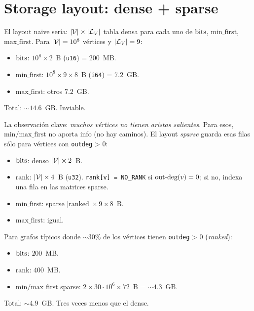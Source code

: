 \section{Storage layout: dense + sparse}

El layout naive sería: \(|\mathcal{V}| \times |\mathcal{L}_V|\) tabla densa para
cada uno de \(\mathrm{bits}\), \(\mathrm{min\_first}\),
\(\mathrm{max\_first}\). Para \(|\mathcal{V}| = 10^8\) vértices y
\(|\mathcal{L}_V| = 9\):

\begin{itemize}
    \item \(\mathrm{bits}\): \(10^8 \times 2\)~B (\texttt{u16}) = \(200\)~MB.
    \item \(\mathrm{min\_first}\): \(10^8 \times 9 \times 8\)~B
    (\texttt{i64}) = \(7.2\)~GB.
    \item \(\mathrm{max\_first}\): otros \(7.2\)~GB.
\end{itemize}

\noindent
Total: \(\sim 14.6\)~GB. Inviable.

La observación clave: \emph{muchos vértices no tienen aristas
salientes}. Para esos, \(\mathrm{min/max\_first}\) no aporta info
(no hay caminos). El layout \emph{sparse} guarda esas filas sólo
para vértices con \texttt{outdeg} > 0:

\begin{itemize}
    \item \(\mathrm{bits}\): denso \(|\mathcal{V}| \times 2\)~B.
    \item \(\mathrm{rank}\): \(|\mathcal{V}| \times 4\)~B (\texttt{u32}).
    \texttt{rank[v] = NO\_RANK} si \(\mathrm{out\text{-}deg}(v) = 0\); si no, indexa
    una fila en las matrices sparse.
    \item \(\mathrm{min\_first}\): sparse \(|\text{ranked}| \times 9
    \times 8\)~B.
    \item \(\mathrm{max\_first}\): igual.
\end{itemize}

\noindent
Para grafos típicos donde \(\sim 30\%\) de los vértices tienen
\texttt{outdeg} > 0 (\emph{ranked}):

\begin{itemize}
    \item \(\mathrm{bits}\): \(200\)~MB.
    \item \(\mathrm{rank}\): \(400\)~MB.
    \item \(\mathrm{min/max\_first}\) sparse: \(2 \times 30 \cdot 10^6
    \times 72\)~B = \(\sim 4.3\)~GB.
\end{itemize}

\noindent
Total: \(\sim 4.9\)~GB. Tres veces menos que el dense.

